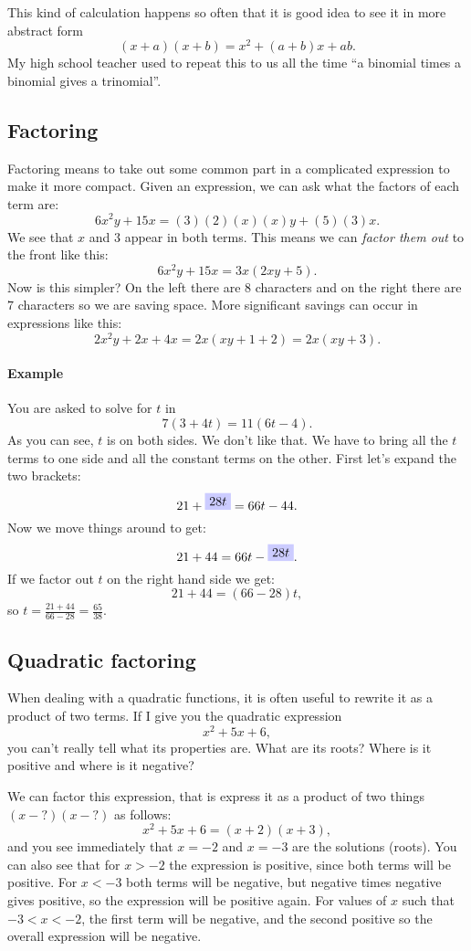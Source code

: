 \documentclass[journal]{IEEEtran}
\newcommand{\dokutitleleveltree}[1]{\subsection{#1}}
\newcommand{\dokutitlelevelfive}[1]{\paragraph{#1}}
\newcommand{\dokuitalic}[1]{\textsl{#1}}
\begin{document}
This kind of calculation happens so often that it is
good idea to see it in more abstract form
\[
  (x+a)(x+b) = x^2 + (a+b)x + ab.
\]
My high school teacher used to repeat this to us all
the time ``a binomial times a binomial gives a trinomial''.


\dokutitleleveltree{Factoring}
\label{bd72fce91eca7fd86b64fe98d212427e}%

Factoring means to take out some common part in a
complicated expression to make it more compact.
Given an expression, we can ask what the 
factors of each term are:
\[
  6x^2y + 15x =   (3)(2)(x)(x)y + (5)(3)x.
\]
We see that \(x\) and \(3\) appear in both terms.
This means we can \dokuitalic{factor them out} to the front
like this:
\[
 6x^2y + 15x =  3x(2xy+5).
\]
Now is this simpler? 
On the left there are \(8\) characters and on the 
right there are \(7\) characters so we are saving space.
More significant savings can occur in expressions like this:
\[
  2x^2y + 2x + 4x = 2x(xy+1+2) =  2x(xy+3).
\]


\dokutitlelevelfive{Example}

You are asked to solve for \(t\) in 
\[
 7(3 + 4t) = 11(6t - 4).
\]
As you can see, \(t\) is on both sides. We don't like that.
We have to bring all the \(t\) terms to one side and all the
constant terms on the other.
First let's expand the two brackets:
\[
 21 + \tikz[remember picture] \node[fill=blue!20] (n2) {$28t$};  = 66t - 44.
\]
Now we move things around to get:
\[
 21 + 44 = 66t -  \tikz[remember picture] \node[fill=blue!20] (n2bis) {$28t$};  .
\]
If we factor out \(t\) on the right hand side we get:
\[
 21 + 44 = (66 - 28)t,
\]
so \(t = \frac{21 + 44}{66 - 28} = \frac{65}{38}\).


\dokutitleleveltree{Quadratic factoring}
\label{231e44a9b24528f89d83cbc42d87e094}%

When dealing with a quadratic functions, it is often
useful to rewrite it as a product of two terms.
If I give you the quadratic expression
\[
  x^2+5x+6,
\]
you can't really tell what its properties are.
What are its roots? Where is it positive and where is it negative?

We can factor this expression, that is express it as a product of two things \((x-?)(x-?)\)
as follows:
\[
  x^2+5x+6 = (x+2)(x+3),
\]
and you see immediately that \(x=-2\) and \(x=-3\) are the solutions (roots).
You can also see that for \(x>-2\) the expression is positive, since 
both terms will be positive. For \(x< -3\) both terms will be negative, but
negative times negative gives positive, so the expression will be positive again.
For values of \(x\) such that \(-3<x< -2\), the first term will be negative, and
the second positive so the overall expression will be negative.
\end{document}
